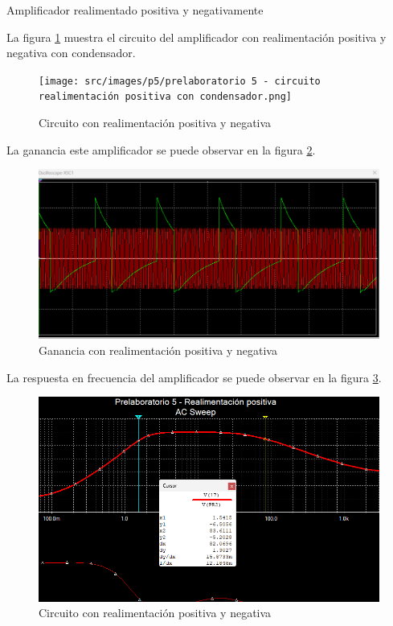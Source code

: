 Amplificador realimentado positiva y negativamente

La figura \ref{fig:circuito-amplificador-realimentacion-positiva-y-negativa} muestra el circuito del amplificador con realimentación positiva y negativa con condensador.

\begin{figure}[ht]
    \centering
    \texttt{[image: src/images/p5/prelaboratorio 5 - circuito realimentación positiva con condensador.png]}
    \caption{Circuito con realimentación positiva y negativa} 
    \label{fig:circuito-amplificador-realimentacion-positiva-y-negativa}
\end{figure}
\FloatBarrier

La ganancia este amplificador se puede observar en la figura \ref{fig:ganancia-amplificador-realimentacion-positiva-y-negativa}.
\begin{figure}[ht]
    \centering
    \includegraphics[width=\textwidth]{src/images/p5/Prelaboratorio 5 - Ganancia realimentacion positiva con condensador.png}
    \caption{Ganancia con realimentación positiva y negativa} 
    \label{fig:ganancia-amplificador-realimentacion-positiva-y-negativa}
\end{figure}
\FloatBarrier

La respuesta en frecuencia del amplificador se puede observar en la figura \ref{fig:respuesta-amplificador-realimentacion-positiva-y-negativa}.

\begin{figure}[ht]
    \centering
    \includegraphics[width=\textwidth]{src/images/p5/Prelaboratorio 5 - Respuesta en frecuencia - realimentacion positiva con condensador.png}
    \caption{Circuito con realimentación positiva y negativa} 
    \label{fig:respuesta-amplificador-realimentacion-positiva-y-negativa}
\end{figure}
